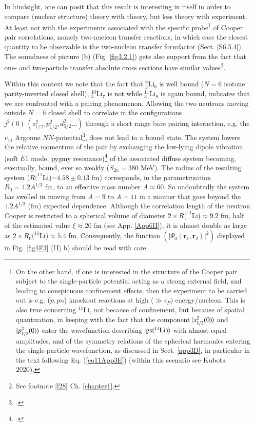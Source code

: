 In hindsight, one can posit that this result is interesting in itself in order  to compare (nuclear structure) theory with theory, but less theory with experiment. At least not with the experiments associated with the specific probe\footnote{On the other hand, if one is interested in the structure of the Cooper pair subject to the single-particle potential acting as a strong external field, and leading to conspicuous confinement effects, then the experiment to be carried out is e.g. ($p,pn$) knockout reactions at high ($\gg\epsilon_F$) energy/nucleon. This is also true concerning $^{11}$Li, not because of confinement, but because of spatial quantization, in keeping with the fact that the component $|{s_{1/2}^2(0)} \rangle$ and $|{p_{1/2}^2(0)} \rangle$ enter the wavefunction describing  $|{gs(^{11}\text{Li})} \rangle$ with almost equal amplitudes, and of the symmetry relations of the spherical harmonics entering the single-particle wavefunction, as discussed in Sect. \ref{app3D}, in particular in the text following Eq. (\ref{eq11App3E}) (within this scenario see \cite{Kubota}\cite{Kubota} Kubota 2020). } of Cooper pair correlations, namely two-nucleon transfer reactions, in which case the closest quantity to be observable is the two-nucleon transfer formfactor (Sect. \ref{S6.5.4}).
 The soundness of picture (b) (Fig. \ref{fig3.2.1}) gets also support from  the fact that one- and two-particle transfer  absolute cross sections have similar values\footnote{\label{f24} See footnote \ref{f28} Ch. \ref{chapter1}.}. 


 Within this context we note that the fact that $^9_3$Li$_6$ is well bound ($N=6$ isotone parity-inverted closed shell), $^{10}_3$Li$_7$ is not while $^{11}_3$Li$_8$ is again bound, indicates that we are confronted with a pairing phenomenon. Allowing the two neutrons moving outside $N=6$ closed shell to correlate in the configurations $j^2(0)\, (s_{1/2}^2, p_{1/2}^2, d_{5/2}^2\dots)$ through a short range bare pairing interaction, e.g. the $v_{14}$ Argonne $NN$-potential\footnote{\cite{Wiringa:84}.}, does not lead to a bound state. The system lowers the relative momentum of the pair by exchanging  the low-lying dipole vibration (soft $E1$ mode, pygmy resonance)\footnote{\cite{Broglia:19}.} of the associated diffuse system becoming, eventually, bound, ever so weakly ($S_{2n}=380$ MeV). The radius of the resulting system ($R(^{11}$Li)=$4.58\pm 0.13$ fm) corresponds, in the parametrization $R_0=1.2 A^{1/3}$ fm, to an effective mass number $A\approx 60$. So undoubtedly the system has swelled in moving from $A=9$ to $A=11$ in a manner that goes beyond the $1.2A^{1/3}$ (fm) expected dependence. Although the correlation length of the neutron Cooper is restricted to a spherical volume of diameter $2\times R(^{11}$Li)$\approx 9.2$ fm, half of the estimated value $\xi\approx 20$ fm (see App. \ref{App6H}), it is almost double as large as $2\times R_0(^{11}$Li)$\approx 5.4$ fm. Consequently, the function $(|\Psi_0(\mathbf r_1,\mathbf r_2)|^2)$ displayed  in Fig. \ref{fig1F3} (II) b) should be read with care.

